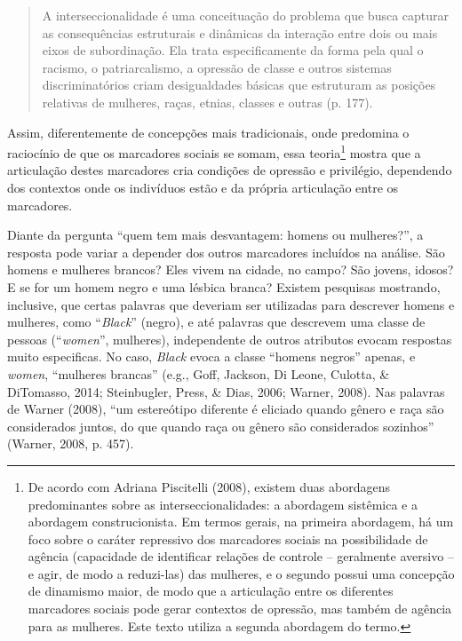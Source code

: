 \begin{quote}
    A interseccionalidade é uma conceituação do problema que busca capturar as consequências estruturais e dinâmicas da interação entre dois ou mais eixos de subordinação. Ela trata especificamente da forma pela qual o racismo, o patriarcalismo, a opressão de classe e outros sistemas discriminatórios criam desigualdades básicas que estruturam as posições relativas de mulheres, raças, etnias, classes e outras (p. 177).
\end{quote}

Assim, diferentemente de concepções mais tradicionais, onde predomina o raciocínio de que os marcadores sociais se somam, essa teoria\footnote{De acordo com Adriana Piscitelli (2008), existem duas abordagens predominantes sobre as interseccionalidades: a abordagem sistêmica e a abordagem construcionista. Em termos gerais, na primeira abordagem, há um foco sobre o caráter repressivo dos marcadores sociais na possibilidade de agência (capacidade de identificar relações de controle – geralmente aversivo – e agir, de modo a reduzi-las) das mulheres, e o segundo possui uma concepção de dinamismo maior, de modo que a articulação entre os diferentes marcadores sociais pode gerar contextos de opressão, mas também de agência para as mulheres. Este texto utiliza a segunda abordagem do termo.} mostra que a articulação destes marcadores cria condições de opressão e privilégio, dependendo dos contextos onde os indivíduos estão e da própria articulação entre os marcadores. 

Diante da pergunta ``quem tem mais desvantagem: homens ou mulheres?'', a resposta pode variar a depender dos outros marcadores incluídos na análise. São homens e mulheres brancos? Eles vivem na cidade, no campo? São jovens, idosos? E se for um homem negro e uma lésbica branca? Existem pesquisas mostrando, inclusive, que certas palavras que deveriam ser utilizadas para descrever homens e mulheres, como ``\textit{Black}'' (negro), e até palavras que descrevem uma classe de pessoas (``\textit{women}'', mulheres), independente de outros atributos evocam respostas muito especificas. No caso, \textit{Black} evoca a classe ``homens negros'' apenas, e \textit{women}, ``mulheres brancas'' (e.g., Goff, Jackson, Di Leone, Culotta, \& DiTomasso, 2014; Steinbugler, Press, \& Dias, 2006; Warner, 2008). Nas palavras de Warner (2008), ``um estereótipo diferente é eliciado quando gênero e raça são considerados juntos, do que quando raça ou gênero são considerados sozinhos'' (Warner, 2008, p. 457).

